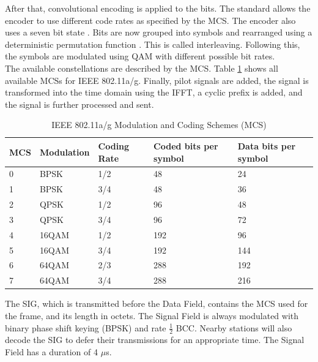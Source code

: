 After that, convolutional encoding is applied to the bits. The standard allows the encoder to use different code rates as specified by the \gls{MCS}. The encoder also uses a seven bit state \cite{park2009}. Bits are now grouped into symbols and rearranged using a deterministic permutation function \cite{perahia2013}. This is called interleaving. Following this, the symbols are modulated using \gls{QAM} with different possible bit rates.\\

The available constellations are described by the \gls{MCS}. Table \ref{tbl:mcs} shows all available \glspl{MCS} for \gls{IEEE} 802.11a/g. Finally, pilot signals are added, the signal is transformed into the time domain using the \gls{IFFT}, a cyclic prefix is added, and the signal is further processed and sent.

\begin{table}[ht]
	\centering
	\begin{tabular}{|p{2.5cm}|p{2.5cm}|p{2.5cm}|p{2.5cm}|p{2.5cm}|}
		\hline
		\textbf{MCS} & \textbf{Modulation} & \textbf{Coding Rate} & \textbf{Coded bits per symbol} & \textbf{Data bits per symbol} \\ \hline
		0 & BPSK & 1/2 & 48 & 24 \\ \hline
		1 & BPSK & 3/4 & 48 & 36 \\ \hline
		2 & QPSK & 1/2 & 96 & 48 \\ \hline
		3 & QPSK & 3/4 & 96 & 72 \\ \hline
		4 & 16QAM & 1/2 & 192 & 96 \\ \hline
		5 & 16QAM & 3/4 & 192 & 144 \\ \hline
		6 & 64QAM & 2/3 & 288 & 192 \\ \hline
		7 & 64QAM & 3/4 & 288 & 216 \\ \hline
	\end{tabular}
	\caption[IEEE 802.11a/g Modulation and Coding Schemes]{IEEE 802.11a/g Modulation and Coding Schemes (MCS) \cite{ieee2012} \label{tbl:mcs}}
\end{table}

The \gls{SIG}, which is transmitted before the Data Field, contains the \gls{MCS} used for the frame, and its length in octets. The Signal Field is always modulated with binary phase shift keying (BPSK) and rate $\frac{1}{2}$ \gls{BCC}. Nearby stations will also decode the \gls{SIG} to defer their transmissions for an appropriate time. The Signal Field has a duration of 4 $\mu$s.\\


